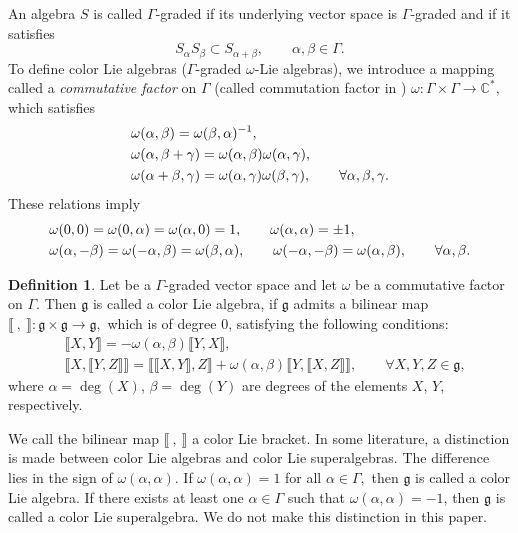 \documentclass[10pt,a4paper]{amsart}
\numberwithin{equation}{section}
\theoremstyle{definition}
\newtheorem{Definition}[Theorem]{Definition}
\def\nn{\notag}
\def\g{\mathfrak{g}}
\begin{document}
An algebra $S$ is called $ \Gamma$-graded if its underlying vector space is $\Gamma$-graded and if it satisfies
\begin{equation*}
	S_{\alpha} S_{\beta} \subset S_{\alpha+\beta}, \qquad \alpha, \beta \in \Gamma.
\end{equation*}
To define color Lie algebras ($\Gamma$-graded $\omega$-Lie algebras), we introduce a mapping called a \textit{commutative factor} on $\Gamma$ (called commutation factor in \cite{scheu}) $ \omega \colon \Gamma \times \Gamma \to \mathbb{C}^{\ast}$, which satisfies
\begin{align}
	&\omega(\alpha,\beta)= \omega(\beta,\alpha)^{-1},
	\nn \\
	&\omega(\alpha,\beta+\gamma)= \omega(\alpha,\beta) \omega(\alpha,\gamma),
	\nn \\
	&\omega(\alpha+\beta,\gamma)= \omega(\alpha,\gamma) \omega(\beta,\gamma), \qquad
	\forall \alpha, \beta, \gamma.
	\label{omegaprop1}
\end{align}
These relations imply
\begin{align}
	&\omega(0,0)= \omega(0,\alpha) = \omega(\alpha,0) =1, \qquad \omega(\alpha,\alpha) = \pm 1,
	\nn\\
	&\omega(\alpha,-\beta)= \omega(-\alpha,\beta) = \omega(\beta,\alpha), \qquad
	\omega(-\alpha,-\beta) = \omega(\alpha,\beta), \qquad \forall \alpha, \beta.
	\label{omegaprop2}
\end{align}

\begin{Definition}
	Let \smash{$\g = \bigoplus_{\gamma\in\Gamma}\g_{\gamma}$} be a $\Gamma$-graded vector space and let $\omega$ be a commutative factor on $\Gamma.$
	Then $\g$ is called a color Lie algebra, if $\g$ admits a bilinear map
	$ \llbracket\ , \ \rrbracket\colon \g \times \g \to \g, $ which is of degree $0$, satisfying the following conditions:
	\begin{align}
		&\llbracket X,Y \rrbracket= -\omega(\alpha,\beta)\llbracket Y,X\rrbracket,
		\nonumber\\
		&\llbracket X, \llbracket Y, Z \rrbracket \rrbracket= \llbracket \llbracket X, Y \rrbracket, Z \rrbracket + \omega(\alpha,\beta) \llbracket Y, \llbracket X, Z \rrbracket \rrbracket,
		\qquad \forall X, Y, Z \in \g,
		\label{colorJacobi}
	\end{align}
	where $ \alpha = \deg(X)$, $\beta = \deg(Y)$ are degrees of the elements $ X$, $Y$, respectively.
\end{Definition}	

We call the bilinear map $ \llbracket\ , \ \rrbracket $ a color Lie bracket.
In some literature, a distinction is made between color Lie algebras and color Lie superalgebras.
The difference lies in the sign of $ \omega(\alpha,\alpha)$.
If $ \omega(\alpha,\alpha) = 1 $ for all $ \alpha \in \Gamma,$ then $\g$ is called a color Lie algebra. If there exists at least one $\alpha \in \Gamma$ such that $\omega(\alpha,\alpha) = -1$, then $\g$ is called a color Lie superalgebra. We do not make this distinction in this paper.
\end{document}
